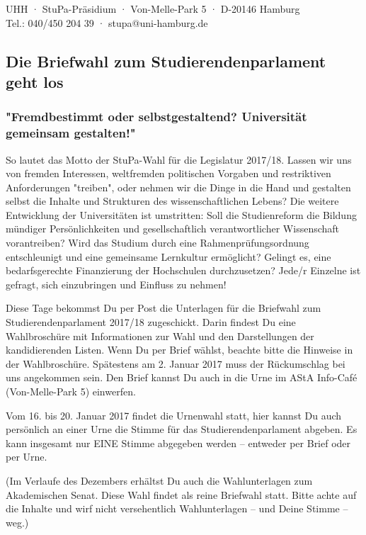 \documentclass[a4paper,ngerman,headheight=80pt,10pt,DIV=calc]{scrartcl}
\begin{document}
    UHH · StuPa-Präsidium · Von-Melle-Park 5 · D-20146 Hamburg\\
    Tel.: 040/450 204 39 · stupa@uni-hamburg.de

    \subsection*{Die Briefwahl zum Studierendenparlament geht los}
    \subsubsection*{"Fremdbestimmt oder selbstgestaltend? Universität gemeinsam gestalten!"}

    So lautet das Motto der StuPa-Wahl für die Legislatur 2017/18. Lassen wir
    uns von fremden Interessen, weltfremden politischen Vorgaben und restriktiven
    Anforderungen "treiben", oder nehmen wir die Dinge in die Hand und gestalten
    selbst die Inhalte und Strukturen des wissenschaftlichen Lebens?
    Die weitere Entwicklung der Universitäten ist umstritten: Soll die Studienreform
    die Bildung mündiger Persönlichkeiten und gesellschaftlich verantwortlicher
    Wissenschaft vorantreiben? Wird das Studium durch eine Rahmenprüfungsordnung
    entschleunigt und eine gemeinsame Lernkultur ermöglicht? Gelingt es, eine
    bedarfsgerechte Finanzierung der Hochschulen durchzusetzen?
    Jede/r Einzelne ist gefragt, sich einzubringen und Einfluss zu nehmen!

    Diese Tage bekommst Du per Post die Unterlagen für die Briefwahl zum
    Studierendenparlament 2017/18 zugeschickt. Darin findest Du eine Wahlbroschüre
    mit Informationen zur Wahl und den Darstellungen der kandidierenden Listen.
    Wenn Du per Brief wählst, beachte bitte die Hinweise in der Wahlbroschüre.
    Spätestens am 2. Januar 2017 muss der Rückumschlag bei uns angekommen sein.
    Den Brief kannst Du auch in die Urne im AStA Info-Café (Von-Melle-Park 5)
    einwerfen.

    Vom 16. bis 20. Januar 2017 findet die Urnenwahl statt, hier kannst Du auch
    persönlich an einer Urne die Stimme für das Studierendenparlament abgeben.
    Es kann insgesamt nur EINE Stimme abgegeben werden – entweder per Brief oder
    per Urne.

    (Im Verlaufe des Dezembers erhältst Du auch die Wahlunterlagen zum
    Akademischen Senat. Diese Wahl findet als reine Briefwahl statt. Bitte achte
    auf die Inhalte und wirf nicht versehentlich Wahlunterlagen – und Deine
    Stimme – weg.)
\end{document}
